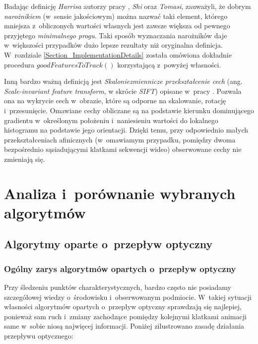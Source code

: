     Badając definicję \textit{Harrisa} autorzy pracy \cite{GoodFeaturesToTrack94}, \textit{Shi} oraz \textit{Tomasi}, zauważyli, że dobrym \textit{narożnikiem} (w~sensie jakościowym) można nazwać taki element, którego mniejsza z~obliczonych wartości własnych jest zawsze większa od pewnego przyjętego \textit{minimalnego progu}. Taki sposób wyznaczania narożników daje w~większości przypadków dużo lepsze rezultaty niż oryginalna definicja. W~rozdziale \ref{Section_ImplementationDetails} została omówiona dokładnie procedura $goodFeaturesToTrack()$ korzystającą z~powyżej własności.

    Inną bardzo ważną definicją jest \textit{Skaloniezmiennicze przekształcenie cech} (ang. \textit{Scale-invariant feature transform}, w skrócie \textit{SIFT}) opisane w~pracy \cite{SalientPointsTracking05}. Pozwala ona na wykrycie cech w~obrazie, które są odporne na skalowanie, rotację i~przesunięcie. Omawiane cechy obliczane są na podstawie kierunku dominującego gradientu w~określonym położeniu i~naniesieniu wartości do lokalnego histogramu na podstawie jego orientacji. Dzięki temu, przy odpowiednio małych przekształceniach afinicznych (w~omawiamym przypadku, pomiędzy dwoma bezpośrednio sąsiadującymi klatkami sekwencji wideo) obserwowane cechy nie zmieniają się.

\chapter{Analiza i~porównanie wybranych algorytmów}\label{Section_Algorytmy}

  \section{Algorytmy oparte o~przepływ optyczny}\label{Subsection_OpticalFlow}

    \subsection{Ogólny zarys algorytmów opartych o~przepływ optyczny}
    Przy śledzeniu punktów charakterystycznych, bardzo często nie posiadamy szczegółowej wiedzy o~środowisku i~obserwowanym podmiocie. W~takiej sytuacji własności algorytmów opartych o~przepływ optyczny sprawdzają się najlepiej, ponieważ sam ruch i~zmiany zachodzące pomiędzy kolejnymi klatkami animacji same w~sobie niosą najwięcej informacji\cite{OpticalFlowNonPriori05}. Poniżej zilustrowano zasadę działania przepływu optycznego:

